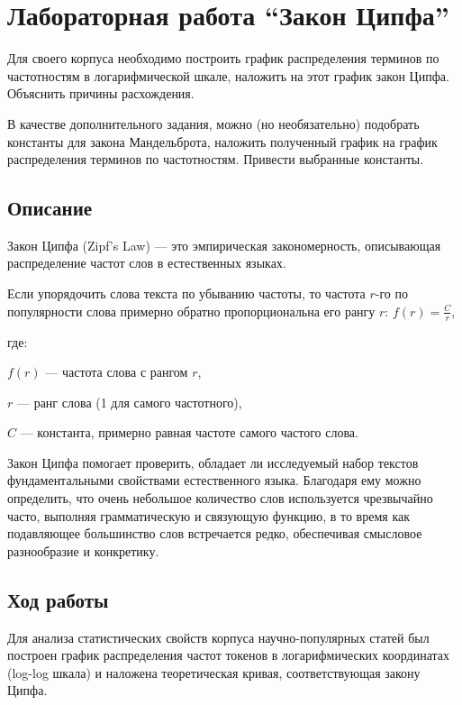 \documentclass[pdf, unicode, 12pt, a4paper, oneside, fleqn]{article}
\begin{document}
\pagebreak

\section{Лабораторная работа  \enquote{Закон Ципфа}}

Для своего корпуса необходимо построить график распределения терминов по частотностям в логарифмической шкале, наложить на этот график закон Ципфа. Объяснить причины расхождения. 

В качестве дополнительного задания, можно (но необязательно) 
подобрать константы для закона Мандельброта, наложить полученный 
график на график распределения терминов по частотностям. Привести 
выбранные константы. 

\subsection*{Описание}

Закон Ципфа (Zipf's Law) — это эмпирическая закономерность, 
описывающая распределение частот слов в естественных языках. 

Если упорядочить слова текста по убыванию частоты, то частота $r$-го 
по популярности слова примерно обратно пропорциональна его рангу $r$:
$f(r) = \frac{C}{r}$,

где:

$f(r)$ — частота слова с рангом $r$, 

$r$ — ранг слова (1 для самого частотного), 

$C$ — константа, примерно равная частоте самого частого слова.

Закон Ципфа помогает проверить, обладает ли исследуемый набор 
текстов фундаментальными свойствами естественного языка. Благодаря 
ему можно определить, что очень небольшое количество слов используется 
чрезвычайно часто, выполняя грамматическую и связующую функцию, в то 
время как подавляющее большинство слов встречается редко, обеспечивая 
смысловое разнообразие и конкретику.

\subsection*{Ход работы}

Для анализа статистических свойств корпуса научно-популярных 
статей был построен график распределения частот токенов в 
логарифмических координатах (log-log шкала) и наложена теоретическая 
кривая, соответствующая закону Ципфа. 
\end{document}
